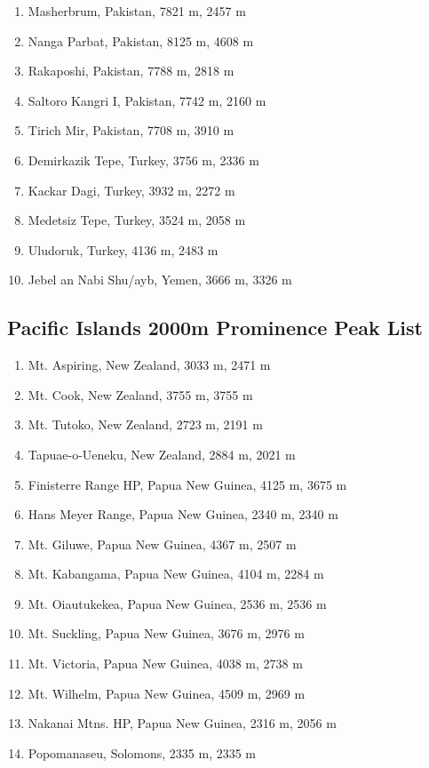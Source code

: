 \documentclass[10pt,twocolumn,letterpaper]{article}
\begin{document}
\begin{flushleft}
\begin{enumerate}
    \item Masherbrum, Pakistan, 7821 m, 2457 m
    \item Nanga Parbat, Pakistan, 8125 m, 4608 m
    \item Rakaposhi, Pakistan, 7788 m, 2818 m
    \item Saltoro Kangri I, Pakistan, 7742 m, 2160 m
    \item Tirich Mir, Pakistan, 7708 m, 3910 m
    \item Demirkazik Tepe, Turkey, 3756 m, 2336 m
    \item Kackar Dagi, Turkey, 3932 m, 2272 m
    \item Medetsiz Tepe, Turkey, 3524 m, 2058 m
    \item Uludoruk, Turkey, 4136 m, 2483 m
    \item Jebel an Nabi Shu/ayb, Yemen, 3666 m, 3326 m
\end{enumerate}
\end{flushleft}

\subsection{Pacific Islands 2000m Prominence Peak List}
\begin{flushleft}
\begin{enumerate}
    \item Mt. Aspiring, New Zealand, 3033 m, 2471 m
    \item Mt. Cook, New Zealand, 3755 m, 3755 m
    \item Mt. Tutoko, New Zealand, 2723 m, 2191 m
    \item Tapuae-o-Ueneku, New Zealand, 2884 m, 2021 m
    \item Finisterre Range HP, Papua New Guinea, 4125 m, 3675 m
    \item Hans Meyer Range, Papua New Guinea, 2340 m, 2340 m
    \item Mt. Giluwe, Papua New Guinea, 4367 m, 2507 m
    \item Mt. Kabangama, Papua New Guinea, 4104 m, 2284 m
    \item Mt. Oiautukekea, Papua New Guinea, 2536 m, 2536 m
    \item Mt. Suckling, Papua New Guinea, 3676 m, 2976 m
    \item Mt. Victoria, Papua New Guinea, 4038 m, 2738 m
    \item Mt. Wilhelm, Papua New Guinea, 4509 m, 2969 m
    \item Nakanai Mtns. HP, Papua New Guinea, 2316 m, 2056 m
    \item Popomanaseu, Solomons, 2335 m, 2335 m
\end{enumerate}
\end{flushleft}
\end{document}
